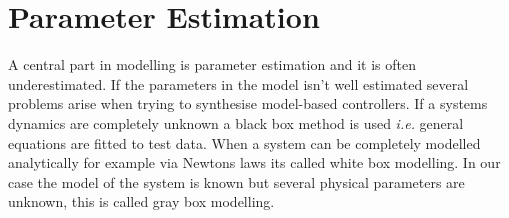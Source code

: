 \chapter{Parameter Estimation} \label{cha:parameterEstimation}
A central part in modelling is parameter estimation and it is often underestimated. If the parameters in the model isn't well estimated several problems arise when trying to synthesise model-based controllers. If a systems dynamics are completely unknown a black box method is used \emph{i.e.} general equations are fitted to test data. When a system can be completely modelled analytically for example via Newtons laws its called white box modelling. In our case the model of the system is known but several physical parameters are unknown, this is called gray box modelling. 


